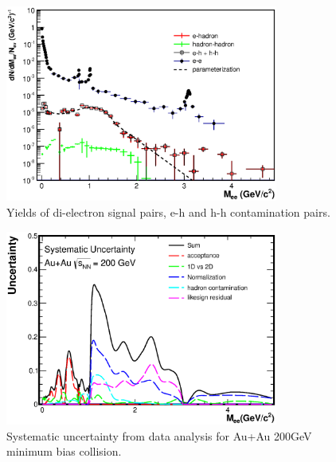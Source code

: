 \begin{figure}
\begin{centering}
\includegraphics[width=0.8\textwidth]{fig/3.Analysis/SysUncertainty/HardonCondeminationAuAu}
\par\end{centering}

\protect\caption{Yields of di-electron signal pairs, e-h and h-h contamination pairs.}


\label{fig: h contamination}

\end{figure}


\begin{figure}
\begin{centering}
\includegraphics[width=0.8\textwidth]{fig/3.Analysis/SysUncertainty/sysErr_AuAu}
\par\end{centering}

\protect\caption{Systematic uncertainty from data analysis for Au+Au 200GeV minimum
bias collision.}


\label{fig:sys AuAu}

\end{figure}


